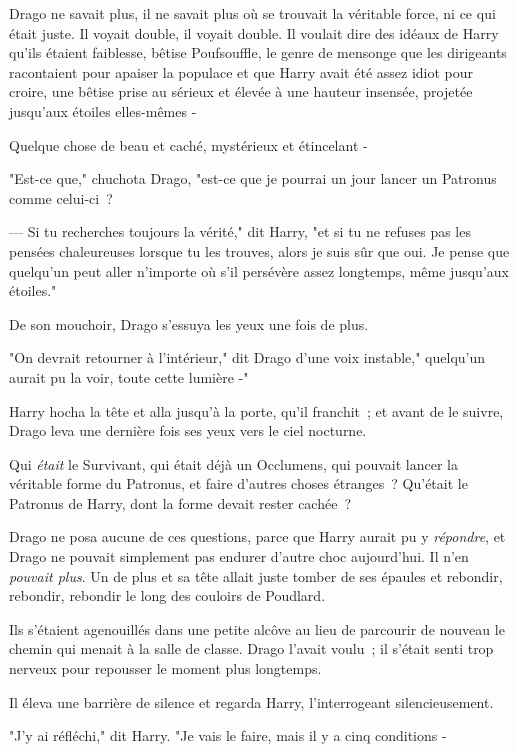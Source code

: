 Drago ne savait plus, il ne savait plus où se trouvait la véritable force, ni ce qui était juste. Il voyait double, il voyait double. Il voulait dire des idéaux de Harry qu'ils étaient faiblesse, bêtise Poufsouffle, le genre de mensonge que les dirigeants racontaient pour apaiser la populace et que Harry avait été assez idiot pour croire, une bêtise prise au sérieux et élevée à une hauteur insensée, projetée jusqu'aux étoiles elles-mêmes -

Quelque chose de beau et caché, mystérieux et étincelant -

"Est-ce que," chuchota Drago, "est-ce que je pourrai un jour lancer un Patronus comme celui-ci~?

--- Si tu recherches toujours la vérité," dit Harry, "et si tu ne refuses pas les pensées chaleureuses lorsque tu les trouves, alors je suis sûr que oui. Je pense que quelqu'un peut aller n'importe où s'il persévère assez longtemps, même jusqu'aux étoiles."

De son mouchoir, Drago s'essuya les yeux une fois de plus.

"On devrait retourner à l'intérieur," dit Drago d'une voix instable," quelqu'un aurait pu la voir, toute cette lumière -"

Harry hocha la tête et alla jusqu'à la porte, qu'il franchit~; et avant de le suivre, Drago leva une dernière fois ses yeux vers le ciel nocturne.

Qui \emph{était} le Survivant, qui était déjà un Occlumens, qui pouvait lancer la véritable forme du Patronus, et faire d'autres choses étranges~? Qu'était le Patronus de Harry, dont la forme devait rester cachée~?

Drago ne posa aucune de ces questions, parce que Harry aurait pu y \emph{répondre}, et Drago ne pouvait simplement pas endurer d'autre choc aujourd'hui. Il n'en \emph{pouvait plus}. Un de plus et sa tête allait juste tomber de ses épaules et rebondir, rebondir, rebondir le long des couloirs de Poudlard.

\later

Ils s'étaient agenouillés dans une petite alcôve au lieu de parcourir de nouveau le chemin qui menait à la salle de classe. Drago l'avait voulu~; il s'était senti trop nerveux pour repousser le moment plus longtemps.

Il éleva une barrière de silence et regarda Harry, l'interrogeant silencieusement.

"J'y ai réfléchi," dit Harry. "Je vais le faire, mais il y a cinq conditions -

